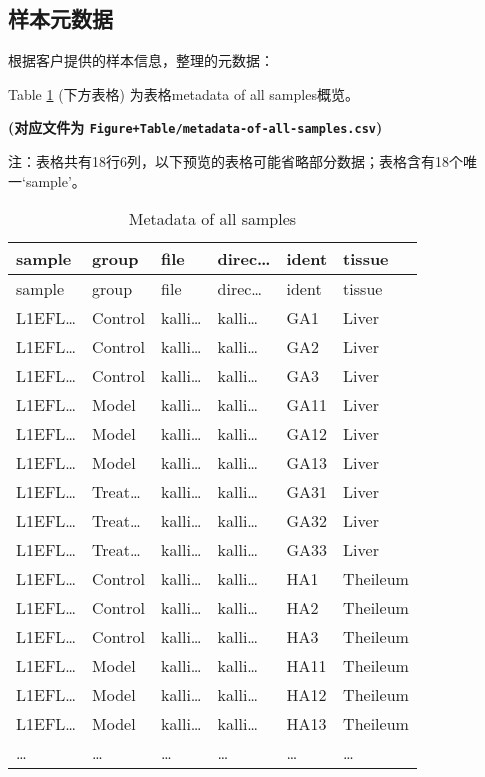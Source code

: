 \documentclass[
]{article}
\begin{document}
\hypertarget{ux6837ux672cux5143ux6570ux636e}{%
\subsection{样本元数据}\label{ux6837ux672cux5143ux6570ux636e}}

根据客户提供的样本信息，整理的元数据：

Table \ref{tab:metadata-of-all-samples} (下方表格) 为表格metadata of all samples概览。

\textbf{(对应文件为 \texttt{Figure+Table/metadata-of-all-samples.csv})}

\begin{center}\begin{tcolorbox}[colback=gray!10, colframe=gray!50, width=0.9\linewidth, arc=1mm, boxrule=0.5pt]注：表格共有18行6列，以下预览的表格可能省略部分数据；表格含有18个唯一`sample'。
\end{tcolorbox}
\end{center}

\begin{longtable}[]{@{}llllll@{}}
\caption{\label{tab:metadata-of-all-samples}Metadata of all samples}\tabularnewline
\toprule
sample & group & file & direc\ldots{} & ident & tissue\tabularnewline
\midrule
\endfirsthead
\toprule
sample & group & file & direc\ldots{} & ident & tissue\tabularnewline
\midrule
\endhead
L1EFL\ldots{} & Control & kalli\ldots{} & kalli\ldots{} & GA1 & Liver\tabularnewline
L1EFL\ldots{} & Control & kalli\ldots{} & kalli\ldots{} & GA2 & Liver\tabularnewline
L1EFL\ldots{} & Control & kalli\ldots{} & kalli\ldots{} & GA3 & Liver\tabularnewline
L1EFL\ldots{} & Model & kalli\ldots{} & kalli\ldots{} & GA11 & Liver\tabularnewline
L1EFL\ldots{} & Model & kalli\ldots{} & kalli\ldots{} & GA12 & Liver\tabularnewline
L1EFL\ldots{} & Model & kalli\ldots{} & kalli\ldots{} & GA13 & Liver\tabularnewline
L1EFL\ldots{} & Treat\ldots{} & kalli\ldots{} & kalli\ldots{} & GA31 & Liver\tabularnewline
L1EFL\ldots{} & Treat\ldots{} & kalli\ldots{} & kalli\ldots{} & GA32 & Liver\tabularnewline
L1EFL\ldots{} & Treat\ldots{} & kalli\ldots{} & kalli\ldots{} & GA33 & Liver\tabularnewline
L1EFL\ldots{} & Control & kalli\ldots{} & kalli\ldots{} & HA1 & Theileum\tabularnewline
L1EFL\ldots{} & Control & kalli\ldots{} & kalli\ldots{} & HA2 & Theileum\tabularnewline
L1EFL\ldots{} & Control & kalli\ldots{} & kalli\ldots{} & HA3 & Theileum\tabularnewline
L1EFL\ldots{} & Model & kalli\ldots{} & kalli\ldots{} & HA11 & Theileum\tabularnewline
L1EFL\ldots{} & Model & kalli\ldots{} & kalli\ldots{} & HA12 & Theileum\tabularnewline
L1EFL\ldots{} & Model & kalli\ldots{} & kalli\ldots{} & HA13 & Theileum\tabularnewline
\ldots{} & \ldots{} & \ldots{} & \ldots{} & \ldots{} & \ldots{}\tabularnewline
\bottomrule
\end{longtable}
\end{document}
